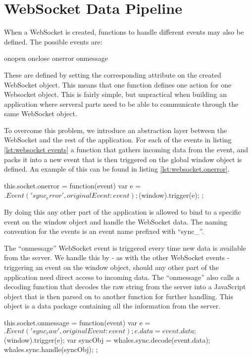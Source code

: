 \section{WebSocket Data Pipeline}

When a WebSocket is created, functions to handle different events may also be
defined. The possible events are:

\begin{snippet}[label=lst:websocket events]
onopen
onclose
onerror
onmessage
\end{snippet}

These are defined by setting the corresponding attribute on the created 
WebSocket object. This means that one function defines one action for one
Websocket object. This is fairly simple, but unpractical when building an
application where serveral parts need to be able to communicate through the 
same WebSocket object.


To overcome this problem, we introduce an abstraction layer between the 
WebSocket and the rest of the application. For each of the events in listing
\ref{lst:websocket events} a function that gathers incoming data from
the event, and packs it into a new event that is then triggered on the global
window object is defined. An example of this can be found in listing
\ref{lst:websocket.onerror}.

\begin{snippet}[caption=The onerror websocket event,label=lst:websocket.onerror] 
this.socket.onerror = function(event){
    var e = $.Event('sync_error',{
        originalEvent:event
    });
    $(window).trigger(e);
};
\end{snippet}

By doing this any other part of the application is allowed to bind to a specific
event on the window object and handle the WebSocket data. The naming convention
for the events is an event name prefixed with ``sync\_''.


The ``onmessage'' WebSocket event is triggered every time new data is available
from the server. We handle this by - as with the other WebSocket events -
triggering an event on the window object, should any other part of the
application need direct access to incoming data. The ``onmessage'' also calls a
decoding function that decodes the raw string from the server into a JavaScript
object that is then parsed on to another function for further handling.
This object is a data package containing all the information from the server.

\begin{snippet}[caption=The onmessage WebSocket event,label=lst:websocket.onmessage]
this.socket.onmessage = function(event){
    var e = $.Event('sync_raw',{
        originalEvent:event
    });
    e.data = event.data;
    $(window).trigger(e);
    var syncObj = whales.sync.decode(event.data);
    whales.sync.handle(syncObj);
};
\end{snippet}

